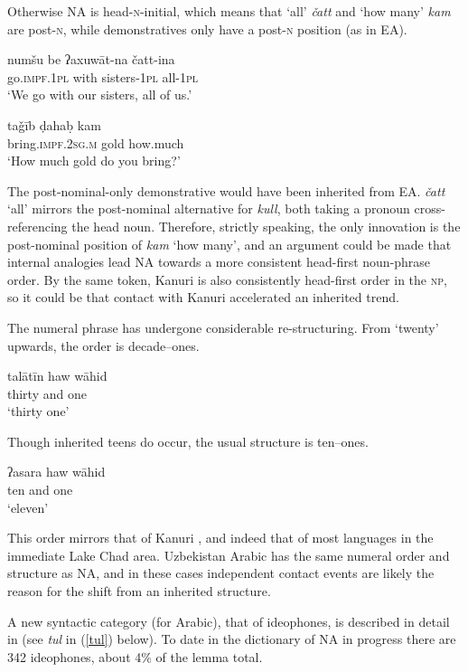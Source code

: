 \documentclass[output=paper]{langsci/langscibook}
\begin{document}
Otherwise NA is head-\textsc{n}-initial, which means that ‘all’ \textit{čatt} and ‘how many’ \textit{kam} are post-\textsc{n}, while demonstratives only have a post-\textsc{n} position (as in EA).

\ea \gll numšu be ʔaxuwāt-na čatt-ina\\
     go.\textsc{impf.1pl} with sisters-1\textsc{pl} all-\textsc{1pl}\\
\glt ‘We go with our sisters, all of us.’
\z

\ea \gll taǧīb ḍahaḅ kam\\
     bring.\textsc{impf.2sg.m} gold how.much\\
\glt ‘How much gold do you bring?’
\z

The post-nominal-only demonstrative would have been inherited from EA. \textit{čatt} ‘all’ mirrors the post-nominal alternative for \textit{kull}, both taking a pronoun cross-referencing the head noun. Therefore, strictly speaking, the only innovation is the post-nominal position of \textit{kam} ‘how many’, and an argument could be made that internal analogies lead NA towards a more consistent head-first noun-phrase order. By the same token, Kanuri is also consistently head-first order in the \textsc{np}, so it could be that contact with Kanuri accelerated an inherited trend.

The numeral phrase has undergone considerable re-structuring. From `twenty' upwards, the order is decade--ones.

\ea \gll talātīn haw wāhid\\
     thirty and one\\
\glt ‘thirty one’
\z

Though inherited teens do occur, the usual structure is ten--ones.

\ea \gll ʔasara haw wāhid\\
     ten and one\\
\glt ‘eleven’
\z

This order mirrors that of Kanuri \citep[203]{Hutchison1981}, and indeed that of most languages in the immediate Lake Chad area. Uzbekistan Arabic has the same numeral order and structure as NA, and in these cases independent contact events are likely the reason for the shift from an inherited structure. 

A new syntactic category (for Arabic), that of ideophones, is described in detail in \citet{OwensHassan2004} (see \textit{tul} in (\ref{tul}) below). To date in the dictionary of NA in progress there are 342 ideophones, about 4\% of the lemma total.
\end{document}

